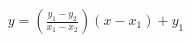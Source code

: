 \documentclass[preview]{standalone}
\begin{document}
\begin{align*}
y = (\frac{y_{1}-y_{2}}{x_{1}-x_{2}}) (x-x_{1}) + y_{1}
\end{align*}
\end{document}
